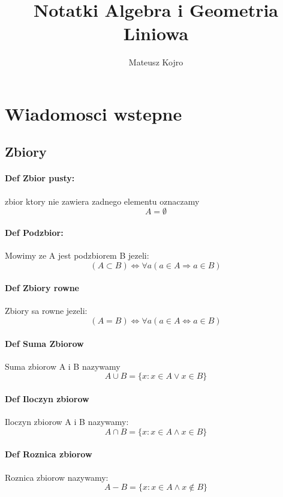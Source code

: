 \documentclass[a4paper]{article}
\title{Notatki Algebra i Geometria Liniowa}
\author{Mateusz Kojro}
\begin{document}
\maketitle
    \section{Wiadomosci wstepne}
    \subsection{Zbiory}
    \paragraph{Def Zbior pusty:}
    zbior ktory nie zawiera zadnego elementu oznaczamy \begin{equation}
        A = \emptyset
    \end{equation}
    \paragraph{Def Podzbior:}
    Mowimy ze A jest podzbiorem B jezeli:
    \begin{equation}
        (A \subset B) \Leftrightarrow \forall a(a \in A \Rightarrow a \in B)
    \end{equation}
    \paragraph{Def Zbiory rowne}
    Zbiory sa rowne jezeli:
    \begin{equation}
        (A = B) \Leftrightarrow \forall a (a \in A \Leftrightarrow a \in B)
    \end{equation}
    \paragraph{Def Suma Zbiorow}
    Suma zbiorow A i B nazywamy
    \begin{equation}
        A \cup B = \{ x : x \in A \vee x \in B\}
    \end{equation}
    \paragraph{Def Iloczyn zbiorow}
    Iloczyn zbiorow A i B nazywamy:
    \begin{equation}
        A \cap B = \{ x:x \in A \wedge x \in B \}
    \end{equation}
    \paragraph{Def Roznica zbiorow}
    Roznica zbiorow nazywamy:
    \begin{equation}
        A - B  = \{x:x \in A \wedge x \notin B\}
    \end{equation}
\end{document}
